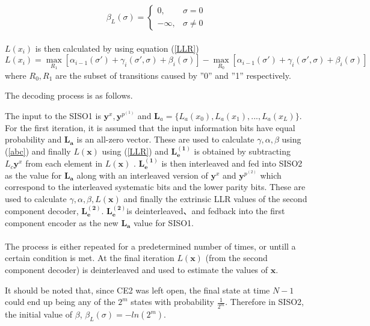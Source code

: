\documentclass[twocolumn]{article}
\begin{document}
\[
   \beta_L(\sigma)= 
\begin{cases}
   0,& \sigma= 0\\        -\infty,              &  \sigma \neq 0
\end{cases}
\]
 \paragraph{}
$ L(x_i)$ is then calculated by using equation (\ref{LLR})
 \begin{equation}
 L(x_i)=\max_{R_1}[\alpha_{i-1}(\sigma')+ \gamma_i(\sigma',\sigma)+\beta_i(\sigma)]
 -
 \max_{R_0}[\alpha_{i-1}(\sigma')+ \gamma_i(\sigma',\sigma)+\beta_i(\sigma)]
\label{LLR}
\end{equation}
where $R_0,R_1$ are the subset of transitions caused by ''0'' and ''1'' respectively.



    
  The decoding process is as follows.
  

The input to the SISO1 is $\mathbf{y}^x,\mathbf{y}^{p^{(1)}}$ 
and $\mathbf{L}_a=\{L_a(x_0),L_a(x_1),...,L_a(x_{L})\}$. 
For the first iteration, it is assumed 
that the input information bits have equal probability and $\mathbf{L_a}$ is an 
all-zero vector.
These are used to calculate $\gamma ,\alpha , \beta$ using (\ref{abc})
 and finally
$ L(\mathbf{x})$ using (\ref{LLR}) and $\mathbf{L_e^{(1)}}$ is obtained by subtracting
 $L_c\mathbf{y}^x$  from each element in $ L(\mathbf{x})$ .
$\mathbf{L_e^{(1)}}$ is then
 interleaved and fed into SISO2 as the value for
 $\mathbf{L_a}$ along with an interleaved version of $\mathbf{y}^{x}$ and 
 $ \mathbf{y}^{p^{(2)}}$ which correspond to
 the interleaved systematic bits and the lower parity bits. These are used to calculate 
 $\gamma,\alpha , 
\beta, L(\mathbf{x})$
 and finally the extrinsic LLR values 
of the second component decoder, $\mathbf{L_e^{(2)}}$.
$\mathbf{L_e^{(2)}}$is deinterleaved、and fedback into the first component encoder
 as the new $\mathbf{L_a}$ value for SISO1.
\paragraph{}
The process is either repeated for a predetermined number of times, or untill a certain 
condition is met. At the final iteration $ L(\mathbf{x})$ (from the second component
 decoder) is deinterleaved and used to estimate the values of $\mathbf{x}$.
 
  It should be noted that, since CE2 was left open, 
 the final state at time $N-1$ could end up being any of the $2^m$ states with 
 probability $\frac{1}{2^m}$. Therefore in SISO2, the initial
 value of $\beta$, $\beta_L(\sigma)=-ln(2^m)$.
\end{document}
